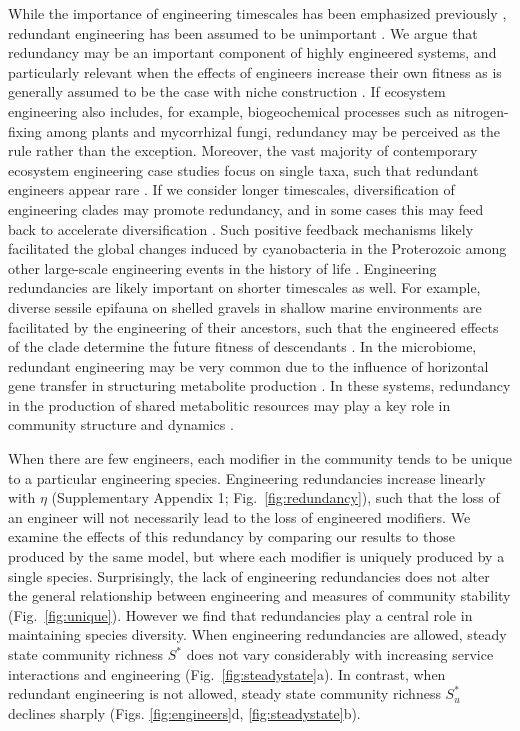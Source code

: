 \documentclass[twocolumn,preprintnumbers,amsmath,amssymb,superscriptaddress,linenumbers]{revtex4-1}
\begin{document}
\begin{bibunit}
While the importance of engineering timescales has been emphasized previously \cite{Hastings2007}, redundant engineering has been assumed to be unimportant \cite{Lawton1994}.
We argue that redundancy may be an important component of highly engineered systems, and particularly relevant when the effects of engineers increase their own fitness \cite{Cuddington2004} as is generally assumed to be the case with niche construction \cite{Krakauer2009}.
If ecosystem engineering also includes, for example, biogeochemical processes such as nitrogen-fixing among plants and mycorrhizal fungi, redundancy may be perceived as the rule rather than the exception.
Moreover, the vast majority of contemporary ecosystem engineering case studies focus on single taxa, such that redundant engineers appear rare \cite{Lawton1994}.
If we consider longer timescales, diversification of engineering clades may promote redundancy, and in some cases this may feed back to accelerate diversification \cite{OdlingSmee2013b}.
Such positive feedback mechanisms likely facilitated the global changes induced by cyanobacteria in the Proterozoic \cite{Erwin2008,Schirrmeister2013} among other large-scale engineering events in the history of life \cite{Erwin2008}.
Engineering redundancies are likely important on shorter timescales as well.
For example, diverse sessile epifauna on shelled gravels in shallow marine environments are facilitated by the engineering of their ancestors, such that the engineered effects of the clade determine the future fitness of descendants \cite{Kidwell1986}.
In the microbiome, redundant engineering may be very common due to the influence of horizontal gene transfer in structuring metabolite production \cite{Polz2013}.
In these systems, redundancy in the production of shared metabolitic resources may play a key role in community structure and dynamics \cite{Kallus2017,Butler2018}.




When there are few engineers, each modifier in the community tends to be unique to a particular engineering species.
Engineering redundancies increase linearly with $\eta$ (Supplementary Appendix 1; Fig.\ \ref{fig:redundancy}), such that the loss of an engineer will not necessarily lead to the loss of engineered modifiers. %
We examine the effects of this redundancy by comparing our results to those produced by the same model, but where each modifier is uniquely produced by a single species.
Surprisingly, the lack of engineering redundancies does not alter the general relationship between engineering and measures of community stability (Fig.\ \ref{fig:unique}).
However we find that redundancies play a central role in maintaining species diversity.
When engineering redundancies are allowed, steady state community richness $S^*$ does not vary considerably with increasing service interactions and engineering (Fig.\ \ref{fig:steadystate}a).
In contrast, when redundant engineering is not allowed, steady state community richness $S^*_u$ declines sharply (Figs. \ref{fig:engineers}d, \ref{fig:steadystate}b).


\end{bibunit}
\end{document}
